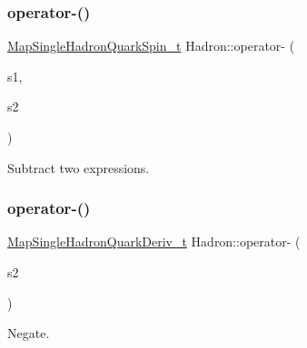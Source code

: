 \subsubsection{\texorpdfstring{operator-\/()}{operator-()}\hspace{0.1cm}{\footnotesize\ttfamily [2/6]}}
{\footnotesize\ttfamily \mbox{\hyperlink{namespaceHadron_a22279e56b59508dc8dd2c8991dc911fd}{Map\+Single\+Hadron\+Quark\+Spin\+\_\+t}} Hadron\+::operator-\/ (\begin{DoxyParamCaption}\item[{const \mbox{\hyperlink{namespaceHadron_a22279e56b59508dc8dd2c8991dc911fd}{Map\+Single\+Hadron\+Quark\+Spin\+\_\+t}} \&}]{s1,  }\item[{const \mbox{\hyperlink{namespaceHadron_a22279e56b59508dc8dd2c8991dc911fd}{Map\+Single\+Hadron\+Quark\+Spin\+\_\+t}} \&}]{s2 }\end{DoxyParamCaption})}



Subtract two expressions. 

\mbox{\label{namespaceHadron_a3420e25a6674cbce229ba6b98f1fa85a}} 
\subsubsection{\texorpdfstring{operator-\/()}{operator-()}\hspace{0.1cm}{\footnotesize\ttfamily [3/6]}}
{\footnotesize\ttfamily \mbox{\hyperlink{namespaceHadron_aa588220689caea8a6aad4d0296526e6b}{Map\+Single\+Hadron\+Quark\+Deriv\+\_\+t}} Hadron\+::operator-\/ (\begin{DoxyParamCaption}\item[{const \mbox{\hyperlink{namespaceHadron_aa588220689caea8a6aad4d0296526e6b}{Map\+Single\+Hadron\+Quark\+Deriv\+\_\+t}} \&}]{s2 }\end{DoxyParamCaption})}



Negate. 

